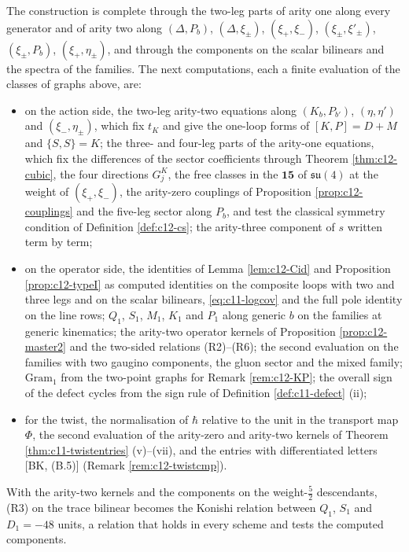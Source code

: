 \begin{remark}
\label{rem:c12-next}
The construction is complete through the two-leg parts of arity one along every generator and of arity two along $(\Delta,P_b)$, $(\Delta,\xi_\pm)$, $(\xi_+,\xi_-)$, $(\xi_\pm,\xi'_\pm)$, $(\xi_\pm,P_b)$, $(\xi_+,\eta_\pm)$, and through the components on the scalar bilinears and the spectra of the families. The next computations, each a finite evaluation of the classes of graphs above, are:
\begin{itemize}
\item on the action side, the two-leg arity-two equations along $(K_b,P_{b'})$, $(\eta,\eta')$ and $(\xi_-,\eta_\pm)$, which fix $t_K$ and give the one-loop forms of $[K,P]=D+M$ and $\{S,S\}=K$; the three- and four-leg parts of the arity-one equations, which fix the differences of the sector coefficients through Theorem \ref{thm:c12-cubic}, the four directions $G^K_j$, the free classes in the $\mathbf{15}$ of $\mathfrak{su}(4)$ at the weight of $(\xi_+,\xi_-)$, the arity-zero couplings of Proposition \ref{prop:c12-couplings} and the five-leg sector along $P_b$, and test the classical symmetry condition of Definition \ref{def:c12-cs}; the arity-three component of $s$ written term by term;
\item on the operator side, the identities of Lemma \ref{lem:c12-Cid} and Proposition \ref{prop:c12-typeI} as computed identities on the composite loops with two and three legs and on the scalar bilinears, \eqref{eq:c11-logcov} and the full pole identity on the line rows; $Q_1$, $S_1$, $M_1$, $K_1$ and $P_1$ along generic $b$ on the families at generic kinematics; the arity-two operator kernels of Proposition \ref{prop:c12-master2} and the two-sided relations (R2)--(R6); the second evaluation on the families with two gaugino components, the gluon sector and the mixed family; $\mathrm{Gram}_1$ from the two-point graphs for Remark \ref{rem:c12-KP}; the overall sign of the defect cycles from the sign rule of Definition \ref{def:c11-defect} (ii);
\item for the twist, the normalisation of $\hbar$ relative to the unit in the transport map $\Phi$, the second evaluation of the arity-zero and arity-two kernels of Theorem \ref{thm:c11-twistentries} (v)--(vii), and the entries with differentiated letters [BK, (B.5)] (Remark \ref{rem:c12-twistcmp}).
\end{itemize}
With the arity-two kernels and the components on the weight-$\tfrac52$ descendants, (R3) on the trace bilinear becomes the Konishi relation between $Q_1$, $S_1$ and $D_1=-48$ units, a relation that holds in every scheme and tests the computed components.
\end{remark}

